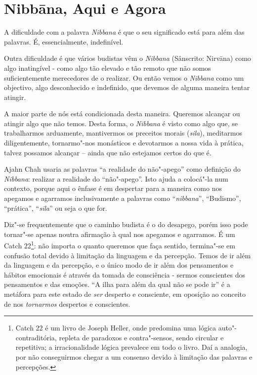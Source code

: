\chapter{Nibbāna, Aqui e Agora}

A dificuldade com a palavra \emph{Nibbana} é que o seu significado está
para além das palavras. É, essencialmente, indefinível.

Outra dificuldade é que vários budistas vêm o \emph{Nibbana} (Sânscrito:
Nirvāna) como algo inatingível - como algo tão elevado e tão remoto que
não somos suficientemente merecedores de o realizar. Ou então vemos o
\emph{Nibbana} como um objectivo, algo desconhecido e indefinido, que
devemos de alguma maneira tentar atingir.

A maior parte de nós está condicionada desta maneira. Queremos alcançar
ou atingir algo que não temos. Desta forma, o \emph{Nibbana} é visto
como algo que, se trabalharmos arduamente, mantivermos os preceitos
morais (\emph{sila}), meditarmos diligentemente, tornarmo"-nos monásticos
e devotarmos a nossa vida à prática, talvez possamos alcançar -- ainda
que não estejamos certos do que é.

Ajahn Chah usaria as palavras ``a realidade do não"-apego'' como
definição do \emph{Nibbana}: realizar a realidade do ``não"-apego''. Isto
ajuda a colocá"-la num contexto, porque aqui o ênfase é em despertar para
a maneira como nos apegamos e agarramos inclusivamente a palavras como
``\emph{nibbana}'', ``Budismo'', ``prática'', ``\emph{sila}'' ou seja o
que for.

Diz"-se frequentemente que o caminho budista é o do desapego, porém isso
pode tornar"-se apenas noutra afirmação à qual nos apegamos e agarramos.
É um Catch 22\footnote{%
Catch 22 é um livro de Joseph Heller, onde predomina uma lógica
auto"-contraditória, repleta de paradoxos e contra"-sensos, sendo circular
e repetitiva; a irracionalidade lógica prevalece em todo o livro. Daí a
analogia, por não conseguirmos chegar a um consenso devido à limitação
das palavras e percepções.}:
não importa o quanto queremos que faça sentido,
termina"-se em confusão total devido à limitação da linguagem e da
percepção. Temos de ir além da linguagem e da percepção, e o único modo
de ir além dos pensamentos e hábitos emocionais é através da tomada de
consciência - sermos conscientes dos pensamentos e das emoções. ``A ilha
para além da qual não se pode ir'' é a metáfora para este estado de
\emph{ser} desperto e consciente, em oposição ao conceito de nos
\emph{tornarmos} despertos e conscientes.

